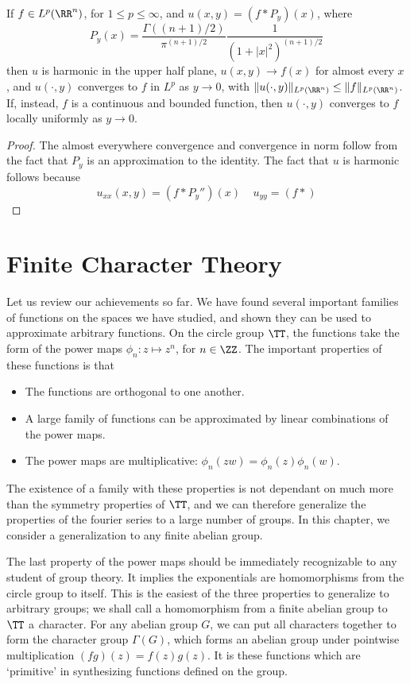 \begin{theorem}
    If $f \in L^p(\RR^n)$, for $1 \leq p \leq \infty$, and $u(x,y) = (f * P_y)(x)$, where
    \[ P_y(x) = \frac{\Gamma((n+1)/2)}{\pi^{(n+1)/2}} \frac{1}{(1 + |x|^2)^{(n+1)/2}} \]
    then $u$ is harmonic in the upper half plane, $u(x,y) \to f(x)$ for almost every $x$, and $u(\cdot,y)$ converges to $f$ in $L^p$ as $y \to 0$, with $\| u(\cdot,y) \|_{L^p(\RR^n)} \leq \| f \|_{L^p(\RR^n)}$. If, instead, $f$ is a continuous and bounded function, then $u(\cdot,y)$ converges to $f$ locally uniformly as $y \to 0$.
\end{theorem}
\begin{proof}
    The almost everywhere convergence and convergence in norm follow from the fact that $P_y$ is an approximation to the identity. The fact that $u$ is harmonic follows because
    \[ u_{xx}(x,y) = (f * P_y'')(x)\ \ \ \ \ u_{yy} = (f * ) \]
\end{proof}










\chapter{Finite Character Theory}

Let us review our achievements so far. We have found several important families of functions on the spaces we have studied, and shown they can be used to approximate arbitrary functions. On the circle group $\TT$, the functions take the form of the power maps $\phi_n: z \mapsto z^n$, for $n \in \ZZ$. The important properties of these functions is that
%
\begin{itemize}
    \item The functions are orthogonal to one another.
    \item A large family of functions can be approximated by linear combinations of the power maps.
    \item The power maps are multiplicative: $\phi_n(zw) = \phi_n(z) \phi_n(w)$.
\end{itemize}
%
The existence of a family with these properties is not dependant on much more than the symmetry properties of $\TT$, and we can therefore generalize the properties of the fourier series to a large number of groups. In this chapter, we consider a generalization to any finite abelian group.

The last property of the power maps should be immediately recognizable to any student of group theory. It implies the exponentials are homomorphisms from the circle group to itself. This is the easiest of the three properties to generalize to arbitrary groups; we shall call a homomorphism from a finite abelian group to $\TT$ a {\emph character}. For any abelian group $G$, we can put all characters together to form the character group $\Gamma(G)$, which forms an abelian group under pointwise multiplication $(fg)(z) = f(z)g(z)$. It is these functions which are `primitive' in synthesizing functions defined on the group.

